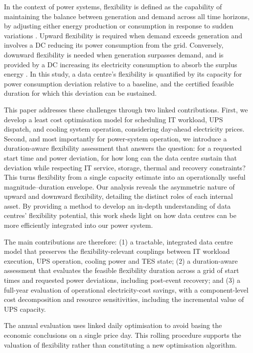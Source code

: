 \documentclass[lettersize,journal]{IEEEtran}
\newcommand{\rev}[1]{#1}
\begin{document}
In the context of power systems, flexibility is defined as the capability of maintaining the balance between generation and demand across all time horizons, by adjusting either energy production or consumption in response to sudden variations \cite{Centrica2020LEM, EEAACER2023Flex, neso2025future, Nosair2015TSTE}. Upward flexibility is required when demand exceeds generation and involves a DC reducing its power consumption from the grid. Conversely, downward flexibility is needed when generation surpasses demand, and is provided by a DC increasing its electricity consumption to absorb the surplus energy \cite{Centrica2020LEM, NG2017SNAPS}. In this study, a data centre's flexibility is quantified by its capacity for power consumption deviation relative to a baseline, and the certified feasible duration for which this deviation can be sustained.

\rev{This paper addresses these challenges through two linked contributions. First, we develop a least cost optimisation model for scheduling IT workload, UPS dispatch, and cooling system operation, considering day-ahead electricity prices. Second, and most importantly for power-system operation, we introduce a duration-aware flexibility assessment that answers the question: for a requested start time and power deviation, for how long can the data centre sustain that deviation while respecting IT service, storage, thermal and recovery constraints? This turns flexibility from a single capacity estimate into an operationally useful magnitude--duration envelope.} Our analysis reveals the asymmetric nature of upward and downward flexibility, detailing the distinct roles of each internal asset. By providing a method to develop an in-depth understanding of data centres' flexibility potential, this work sheds light on how data centres can be more efficiently integrated into our power system.

\rev{The main contributions are therefore: (1) a tractable, integrated data centre model that preserves the flexibility-relevant couplings between IT workload execution, UPS operation, cooling power and TES state; (2) a duration-aware assessment that evaluates the feasible flexibility duration across a grid of start times and requested power deviations, including post-event recovery; and (3) a full-year evaluation of operational electricity-cost savings, with a component-level cost decomposition and resource sensitivities, including the incremental value of UPS capacity.}

The annual evaluation uses linked daily optimisation to avoid basing the economic conclusions on a single price day. This rolling procedure supports the valuation of flexibility rather than constituting a new optimisation algorithm.
\end{document}
